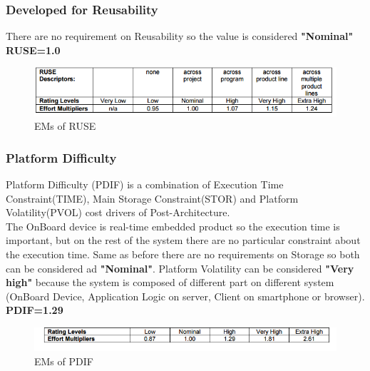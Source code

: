 		
\subsubsection{Developed for Reusability}		
		There are no requirement on Reusability so the value is considered \textbf{"Nominal"}
\\
\textbf{RUSE=1.0}
			
		\begin{figure}[H] 
			\centering
			\includegraphics[scale = 0.6]{img/RUSE.png}
			\caption{EMs of RUSE}
		\end{figure}

\subsubsection{Platform Difficulty}		
Platform Difficulty (PDIF) is a combination of Execution Time Constraint(TIME), Main Storage Constraint(STOR) and Platform Volatility(PVOL) cost drivers of Post-Architecture. 
		\\
		The OnBoard device is real-time embedded product so the execution time is important, but on the rest of the system there are no particular constraint about the execution time. Same as before there are no requirements on Storage so both can be considered ad \textbf{"Nominal"}.
		Platform Volatility can be considered \textbf{"Very high"} because the system is composed of different part on different system (OnBoard Device, Application Logic on server, Client on smartphone or browser).
		\\
		\textbf{PDIF=1.29}
		
		\begin{figure}[H] 
			\centering
			\includegraphics[scale = 0.6]{img/PDIF.png}
			\caption{EMs of PDIF}
		\end{figure}
	
